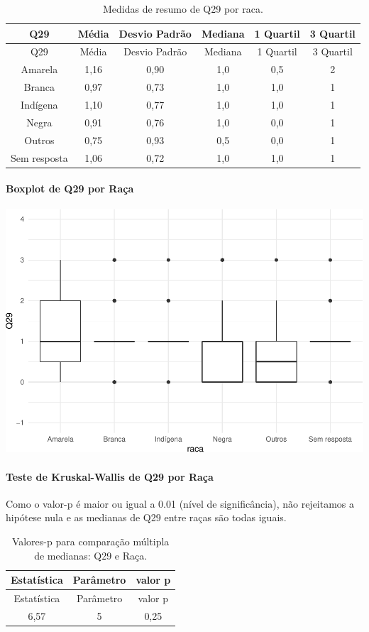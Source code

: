 \documentclass[]{article}
\let\oldparagraph\paragraph
\renewcommand{\paragraph}[1]{\oldparagraph{#1}\mbox{}}
\begin{document}
\begin{longtable}[]{@{}cccccc@{}}
\caption{\label{tab:unnamed-chunk-931}Medidas de resumo de Q29 por raca.}\tabularnewline
\toprule
Q29 & Média & Desvio Padrão & Mediana & 1 Quartil & 3 Quartil\tabularnewline
\midrule
\endfirsthead
\toprule
Q29 & Média & Desvio Padrão & Mediana & 1 Quartil & 3 Quartil\tabularnewline
\midrule
\endhead
Amarela & 1,16 & 0,90 & 1,0 & 0,5 & 2\tabularnewline
Branca & 0,97 & 0,73 & 1,0 & 1,0 & 1\tabularnewline
Indígena & 1,10 & 0,77 & 1,0 & 1,0 & 1\tabularnewline
Negra & 0,91 & 0,76 & 1,0 & 0,0 & 1\tabularnewline
Outros & 0,75 & 0,93 & 0,5 & 0,0 & 1\tabularnewline
Sem resposta & 1,06 & 0,72 & 1,0 & 1,0 & 1\tabularnewline
\bottomrule
\end{longtable}

\hypertarget{boxplot-de-q29-por-rauxe7a}{%
\paragraph{Boxplot de Q29 por Raça}\label{boxplot-de-q29-por-rauxe7a}}

\begin{center}\includegraphics[width=0.75\linewidth]{relatorio_covid19_files/figure-latex/unnamed-chunk-932-1} \end{center}

\hypertarget{teste-de-kruskal-wallis-de-q29-por-rauxe7a}{%
\paragraph{Teste de Kruskal-Wallis de Q29 por Raça}\label{teste-de-kruskal-wallis-de-q29-por-rauxe7a}}

Como o valor-p é maior ou igual a 0.01 (nível de significância), não rejeitamos a hipótese nula e as medianas de Q29 entre raças são todas iguais.

\begin{longtable}[]{@{}ccc@{}}
\caption{\label{tab:unnamed-chunk-934}Valores-p para comparação múltipla de medianas: Q29 e Raça.}\tabularnewline
\toprule
Estatística & Parâmetro & valor p\tabularnewline
\midrule
\endfirsthead
\toprule
Estatística & Parâmetro & valor p\tabularnewline
\midrule
\endhead
6,57 & 5 & 0,25\tabularnewline
\bottomrule
\end{longtable}
\end{document}
